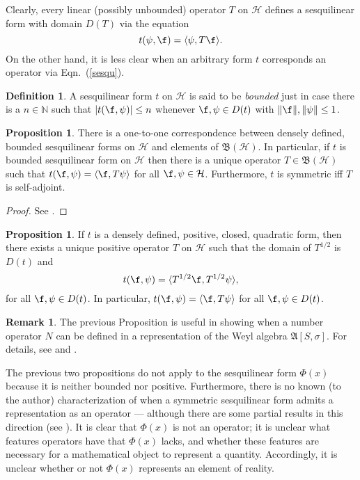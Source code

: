 \documentclass[11pt]{article}
\newcommand{\alg}[1]{\mathfrak{#1}}
\newcommand{\norm}[1]{\| #1\|}
\newcommand{\bh}{\mathfrak{B}(\mathcal{H})}
\newcommand{\abs}[1]{|#1|}
\theoremstyle{definition}
\newtheorem{prop}[thm]{Proposition}
\theoremstyle{definition}
\newtheorem{defn}[thm]{Definition}
\newtheorem{note}[thm]{Remark}
\theoremstyle{remark}
\def\2#1{{\mathcal #1}}
\def\7#1{{\mathbb #1}}
\begin{document}
Clearly, every linear (possibly unbounded) operator $T$ on $\2H$
defines a sesquilinear form with domain $D(T)$ via the equation
\begin{equation} t(\psi ,\f )=\langle \psi ,T\f \rangle .\label{sesqu}
\end{equation} On the other hand, it is less clear when an arbitrary
form $t$ corresponds an operator via Eqn.\ (\ref{sesqu}).  

\begin{defn} A sesquilinear form $t$ on $\2H$ is said to be
  \emph{bounded} just in case there is a $n \in \7N$ such that
  $\abs{t(\f ,\psi )}\leq n$ whenever $\f ,\psi \in D(t)$ with
  $\norm{\f },\norm{\psi }\leq 1$. \end{defn}

\begin{prop} There is a one-to-one correspondence between densely
  defined, bounded sesquilinear forms on $\2H$ and elements of $\bh$.
  In particular, if $t$ is bounded sesquilinear form on $\2H$ then
  there is a unique operator $T\in \bh$ such that $t(\f ,\psi)=\langle
  \f,T\psi \rangle$ for all $\f ,\psi \in \2H$.  Furthermore, $t$ is
  symmetric iff $T$ is self-adjoint.
\end{prop}

\begin{proof} See \cite[Theorem 2.4.1]{kr}.  \end{proof}

\begin{prop} If $t$ is a densely defined, positive, closed, quadratic
  form, then there exists a unique positive operator $T$ on $\2H$ such
  that the domain of $T^{1/2}$ is $D(t)$ and
$$ t(\f ,\psi )=\langle T^{1/2}\f ,T^{1/2}\psi \rangle ,$$
for all $\f ,\psi \in D(t)$.  In particular, $t(\f ,\psi )=\langle \f
,T\psi \rangle$ for all $\f ,\psi \in D(t)$.  \end{prop}

\begin{note} The previous Proposition is useful in showing when a
  number operator $N$ can be defined in a representation of the Weyl
  algebra $\alg{A}[S,\sigma ]$.  For details, see \cite{rindler} and
  \cite[p.\ 27]{brat2}. \end{note}

The previous two propositions do not apply to the sesquilinear form
$\Phi (x)$ because it is neither bounded nor positive.  Furthermore,
there is no known (to the author) characterization of when a symmetric
sesquilinear form admits a representation as an operator --- although
there are some partial results in this direction (see \cite{mcin}).
It is clear that $\Phi (x)$ is not an operator; it is unclear what
features operators have that $\Phi (x)$ lacks, and whether these
features are necessary for a mathematical object to represent a
quantity.  Accordingly, it is unclear whether or not $\Phi (x)$
represents an element of reality.
\end{document}
